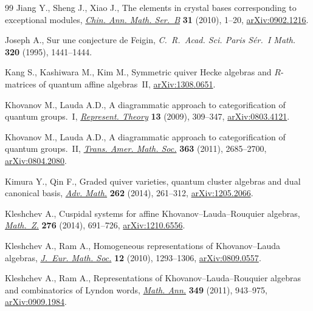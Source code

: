 \documentclass[pdftex]{sigma}
\numberwithin{equation}{section}
\begin{document}
\begin{thebibliography}{99}
Jiang Y., Sheng J., Xiao J., The elements in crystal bases corresponding to
  exceptional modules, \href{http://dx.doi.org/10.1007/s11401-009-0026-4}{\textit{Chin. Ann. Math. Ser.~B}} \textbf{31} (2010),
  1--20, \href{http://arxiv.org/abs/0902.1216}{arXiv:0902.1216}.

Joseph A., Sur une conjecture de {F}eigin, \textit{C.~R.~Acad. Sci. Paris
  S\'er.~I Math.} \textbf{320} (1995), 1441--1444.

Kang S., Kashiwara M., Kim M., Symmetric quiver Hecke algebras and $R$-matrices
  of quantum af\/f\/ine algebras~II, \href{http://arxiv.org/abs/1308.0651}{arXiv:1308.0651}.

Khovanov M., Lauda A.D., A diagrammatic approach to categorif\/ication of quantum
  groups.~{I}, \href{http://dx.doi.org/10.1090/S1088-4165-09-00346-X}{\textit{Represent. Theory}} \textbf{13} (2009), 309--347,
  \href{http://arxiv.org/abs/0803.4121}{arXiv:0803.4121}.

Khovanov M., Lauda A.D., A diagrammatic approach to categorif\/ication of quantum
  groups.~{II}, \href{http://dx.doi.org/10.1090/S0002-9947-2010-05210-9}{\textit{Trans. Amer. Math. Soc.}} \textbf{363} (2011),
  2685--2700, \href{http://arxiv.org/abs/0804.2080}{arXiv:0804.2080}.

Kimura Y., Qin F., Graded quiver varieties, quantum cluster algebras and dual
  canonical basis, \href{http://dx.doi.org/10.1016/j.aim.2014.05.014}{\textit{Adv. Math.}} \textbf{262} (2014), 261--312,
  \href{http://arxiv.org/abs/1205.2066}{arXiv:1205.2066}.

Kleshchev A., Cuspidal systems for af\/f\/ine {K}hovanov--{L}auda--{R}ouquier
  algebras, \href{http://dx.doi.org/10.1007/s00209-013-1219-9}{\textit{Math.~Z.}} \textbf{276} (2014), 691--726,
  \href{http://arxiv.org/abs/1210.6556}{arXiv:1210.6556}.

Kleshchev A., Ram A., Homogeneous representations of {K}hovanov--{L}auda
  algebras, \href{http://dx.doi.org/10.4171/JEMS/230}{\textit{J.~Eur. Math. Soc.}} \textbf{12} (2010), 1293--1306,
  \href{http://arxiv.org/abs/0809.0557}{arXiv:0809.0557}.

Kleshchev A., Ram A., Representations of {K}hovanov--{L}auda--{R}ouquier
  algebras and combinatorics of {L}yndon words, \href{http://dx.doi.org/10.1007/s00208-010-0543-1}{\textit{Math. Ann.}}
  \textbf{349} (2011), 943--975, \href{http://arxiv.org/abs/0909.1984}{arXiv:0909.1984}.




\end{thebibliography}
\end{document}
